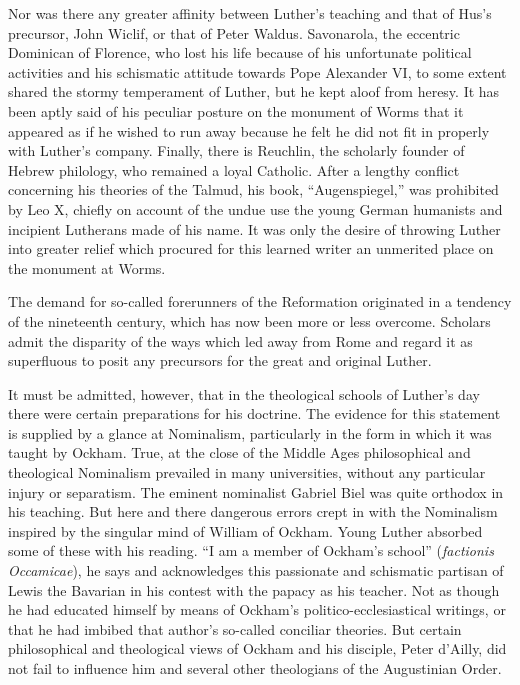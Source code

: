 Nor was there any greater affinity between Luther’s teaching
and that of Hus’s precursor, John Wiclif, or that of Peter Waldus.
Savonarola, the eccentric Dominican of Florence, who lost his life
because of his unfortunate political activities and his schismatic attitude
towards Pope Alexander VI, to some extent shared the stormy
temperament of Luther, but he kept aloof from heresy. It has been
aptly said of his peculiar posture on the monument of Worms
that it appeared as if he wished to run away because he felt he did
not fit in properly with Luther’s company. Finally, there is Reuchlin,
the scholarly founder of Hebrew philology, who remained a loyal
Catholic. After a lengthy conflict concerning his theories of the
Talmud, his book, “Augenspiegel,” was prohibited by Leo X, chiefly
on account of the undue use the young German humanists and incipient
Lutherans made of his name. It was only the desire of
throwing Luther into greater relief which procured for this learned
writer an unmerited place on the monument at Worms.

The demand for so-called forerunners of the Reformation originated in a
tendency of the nineteenth century, which has now been
more or less overcome. Scholars admit the disparity of the ways which
led away from Rome and regard it as superfluous to posit any precursors
for the great and original Luther.

It must be admitted, however, that in the theological schools of
Luther’s day there were certain preparations for his doctrine. The
evidence for this statement is supplied by a glance at Nominalism,
particularly in the form in which it was taught by Ockham. True,
at the close of the Middle Ages philosophical and theological Nominalism
prevailed in many universities, without any particular injury
or separatism. The eminent nominalist Gabriel Biel was quite
orthodox in his teaching. But here and there dangerous errors crept
in with the Nominalism inspired by the singular mind of William
of Ockham. Young Luther absorbed some of these with his reading.
“I am a member of Ockham’s school” (\textit{factionis Occamicae}),
he says and acknowledges this passionate and schismatic partisan of
Lewis the Bavarian in his contest with the papacy as his teacher.
Not as though he had educated himself by means of Ockham’s
politico-ecclesiastical writings, or that he had imbibed that author’s
so-called conciliar theories. But certain philosophical and theological
views of Ockham and his disciple, Peter d’Ailly, did not fail to
influence him and several other theologians of the Augustinian
Order.

